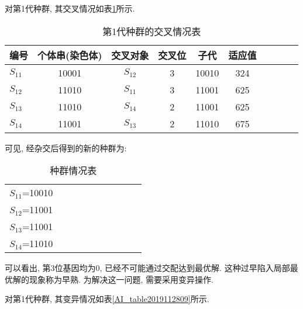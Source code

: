 {对第1代种群, 其交叉情况如表\ref{AI_table2019112808}所示.

\begin{table} [H]
\caption{第1代种群的交叉情况表}
\begin{center}
\begin{tabular} {lccccccccc}
  \hline
编号	&个体串(染色体)&	交叉对象&	交叉位&	子代&	适应值\\
  \hline
$S_{11}$	&10001	&$S_{12}$	&3	&10010&	324\\
$S_{12}$	&11010	&$S_{11}$	&3	&11001&	625\\
$S_{13}$	&11010	&$S_{14}$	&2	&11001&	625\\
$S_{14}$	&11001	&$S_{13}$	&2	&11010&	675\\
\hline
\end{tabular}
\end{center}
\label{AI_table2019112808}
\end{table}
可见, 经杂交后得到的新的种群为:
\begin{table} [H]
\caption{种群情况表}
\begin{center}
\begin{tabular} {lccccccccc}
\hline
$S_{11}$=10010\\
$S_{12}$=11001\\
$S_{13}$=11001\\
$S_{14}$=11010\\
\hline
\end{tabular}
\end{center}
\end{table}
可以看出, 第3位基因均为0, 已经不可能通过交配达到最优解. 这种过早陷入局部最优解的现象称为早熟. 为解决这一问题, 需要采用变异操作.

对第1代种群, 其变异情况如表\ref{AI_table2019112809}所示.

}
